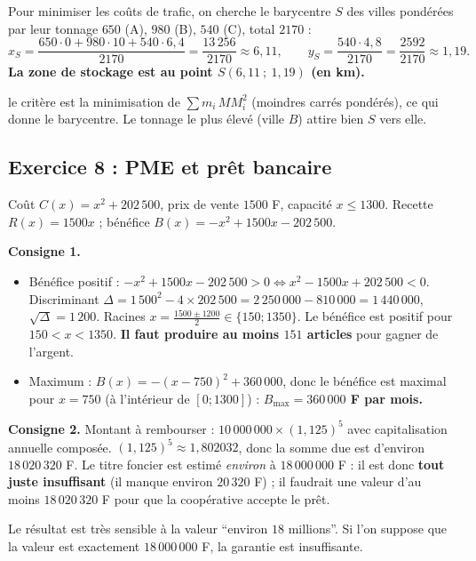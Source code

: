 Pour minimiser les co\^uts de trafic, on cherche le barycentre $S$ des villes pond\'er\'ees par leur tonnage
$650$ (A), $980$ (B), $540$ (C), total $2170$ :
\[
x_S=\frac{650\cdot0+980\cdot10+540\cdot6{,}4}{2170}=\frac{13\,256}{2170}\approx 6{,}11,\qquad
y_S=\frac{540\cdot4{,}8}{2170}=\frac{2592}{2170}\approx 1{,}19.
\]
\textbf{La zone de stockage est au point $S(6{,}11\ ;\ 1{,}19)$ (en km).}
\begin{hyp}le crit\`ere est la minimisation de $\sum m_i\,MM_i^2$ (moindres carr\'es pond\'er\'es), ce qui donne le barycentre.
Le tonnage le plus \'elev\'e (ville $B$) attire bien $S$ vers elle.\end{hyp}

\subsection{Exercice 8 : PME et pr\^et bancaire}

Co\^ut $C(x)=x^2+202\,500$, prix de vente $1500$ F, capacit\'e $x\le1300$.
Recette $R(x)=1500x$ ; b\'en\'efice $B(x)=-x^2+1500x-202\,500$.

\textbf{Consigne 1.}
\begin{itemize}
  \item B\'en\'efice positif : $-x^2+1500x-202\,500>0\iff x^2-1500x+202\,500<0$.
  Discriminant $\Delta=1\,500^2-4\times202\,500=2\,250\,000-810\,000=1\,440\,000$, $\sqrt\Delta=1\,200$.
  Racines $x=\frac{1500\pm1200}{2}\in\{150;1350\}$. Le b\'en\'efice est positif pour $150<x<1350$.
  \textbf{Il faut produire au moins $151$ articles} pour gagner de l'argent.
  \item Maximum : $B(x)=-(x-750)^2+360\,000$, donc le b\'en\'efice est maximal pour $x=750$ (\`a l'int\'erieur de $[0;1300]$) :
  \textbf{$B_{\max}=360\,000$ F par mois.}
\end{itemize}

\textbf{Consigne 2.} Montant \`a rembourser : $10\,000\,000\times(1{,}125)^5$ avec capitalisation annuelle compos\'ee.
$(1{,}125)^5\approx1{,}802032$, donc la somme due est d'environ $18\,020\,320$ F.
Le titre foncier est estim\'e \emph{environ} \`a $18\,000\,000$ F : il est donc \textbf{tout juste insuffisant}
(il manque environ $20\,320$ F) ; il faudrait une valeur d'au moins $18\,020\,320$ F pour que la coop\'erative accepte le pr\^et.
\begin{rem} Le r\'esultat est tr\`es sensible \`a la valeur ``environ $18$ millions''. Si l'on suppose que la valeur est
exactement $18\,000\,000$ F, la garantie est insuffisante.\end{rem}

